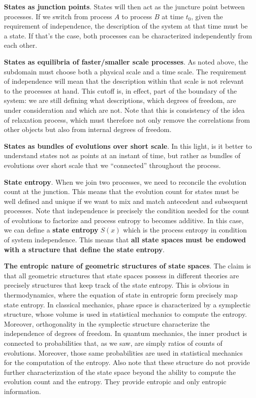\documentclass[10pt, onecolumn, longbibliography, nofootinbib]{revtex4-2}
\begin{document}
\textbf{States as junction points}. States will then act as the juncture point between processes. If we switch from process $A$ to process $B$ at time $t_0$, given the requirement of independence, the description of the system at that time must be a state. If that's the case, both processes can be characterized independently from each other.

\textbf{States as equilibria of faster/smaller scale processes}. As noted above, the subdomain must choose both a physical scale and a time scale. The requirement of independence will mean that the description within that scale is not relevant to the processes at hand. This cutoff is, in effect, part of the boundary of the system: we are still defining what descriptions, which degrees of freedom, are under consideration and which are not. Note that this is consistency of the idea of relaxation process, which must therefore not only remove the correlations from other objects but also from internal degrees of freedom.

\textbf{States as bundles of evolutions over short scale}. In this light, is it better to understand states not as points at an instant of time, but rather as bundles of evolutions over short scale that we ``connected'' throughout the process.

\textbf{State entropy}. When we join two processes, we need to reconcile the evolution count at the junction. This means that the evolution count for states must be well defined and unique if we want to mix and match antecedent and subsequent processes. Note that independence is precisely the condition needed for the count of evolutions to factorize and process entropy to becomes additive. In this case, we can define a \textbf{state entropy} $S(x)$ which is the process entropy in condition of system independence. This means that \textbf{all state spaces must be endowed with a structure that define the state entropy}.

\textbf{The entropic nature of geometric structures of state spaces}. The claim is that all geometric structures that state spaces possess in different theories are precisely structures that keep track of the state entropy. This is obvious in thermodynamics, where the equation of state in entropric form precisely map state entropy. In classical mechanics, phase space is characterized by a symplectic structure, whose volume is used in statistical mechanics to compute the entropy. Moreover, orthogonality in the symplectic structure characterize the independence of degrees of freedom. In quantum mechanics, the inner product is connected to probabilities that, as we saw, are simply ratios of counts of evolutions. Moreover, those same probabilities are used in statistical mechanics for the computation of the entropy. Also note that these structure do not provide further characterization of the state space beyond the ability to compute the evolution count and the entropy. They provide entropic and only entropic information.
\end{document}
